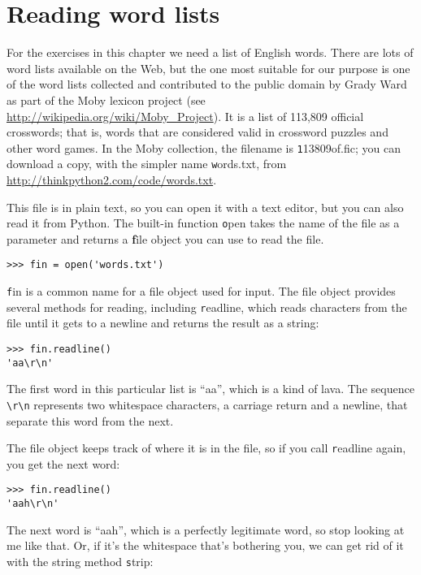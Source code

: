 \documentclass[
DIV=11,
fontsize=13,
twoside,
headinclude=false,
titlepage=firstiscover,
abstract=true,
headsepline=true,
footsepline=true,
chapterprefix=true, %
headings=big,
bibliography=totoc,%
captions=tableheading
]{scrbook}
\theoremstyle{definition}
\begin{document}
\section{Reading word lists}
\label{wordlist}

For the exercises in this chapter we need a list of English words.
There are lots of word lists available on the Web, but the one most
suitable for our purpose is one of the word lists collected and
contributed to the public domain by Grady Ward as part of the Moby
lexicon project (see \url{http://wikipedia.org/wiki/Moby_Project}).  It
is a list of 113,809 official crosswords; that is, words that are
considered valid in crossword puzzles and other word games.  In the
Moby collection, the filename is {\texttt 113809of.fic}; you can download
a copy, with the simpler name {\texttt words.txt}, from
\url{http://thinkpython2.com/code/words.txt}.

This file is in plain text, so you can open it with a text
editor, but you can also read it from Python.  The built-in
function {\texttt open} takes the name of the file as a parameter
and returns a {\textbf file object} you can use to read the file.

\begin{lstlisting}
>>> fin = open('words.txt')
\end{lstlisting}
%
{\texttt fin} is a common name for a file object used for input.  The file
object provides several methods for reading, including {\texttt readline},
which reads characters from the file until it gets to a newline and
returns the result as a string: 

\begin{lstlisting}
>>> fin.readline()
'aa\r\n'
\end{lstlisting}
%
The first word in this particular list is ``aa'', which is a kind of
lava.  The sequence \verb"\r\n" represents two whitespace characters,
a carriage return and a newline, that separate this word from the
next.

The file object keeps track of where it is in the file, so
if you call {\texttt readline} again, you get the next word:

\begin{lstlisting}
>>> fin.readline()
'aah\r\n'
\end{lstlisting}
%
The next word is ``aah'', which is a perfectly legitimate
word, so stop looking at me like that.
Or, if it's the whitespace that's bothering you,
we can get rid of it with the string method {\texttt strip}:
\end{document}
